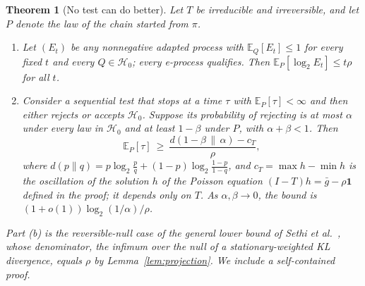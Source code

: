 \documentclass[11pt]{article}
\newtheorem{theorem}{Theorem}[section]
\theoremstyle{definition}
\theoremstyle{remark}
\newcommand{\E}{\mathbb{E}}
\newcommand{\Hnull}{\mathcal{H}_0}
\begin{document}
\begin{theorem}[No test can do better]\label{thm:lower}
Let $T$ be irreducible and irreversible, and let $P$ denote the law of the chain started from $\pi$.
\begin{enumerate}[label=(\alph*),itemsep=0.1em]
\item Let $(E_t)$ be any nonnegative adapted process with $\E_Q[E_t]\le1$ for every fixed $t$ and every $Q\in\Hnull$; every e-process qualifies. Then $\E_P[\log_2E_t]\le t\rho$ for all $t$.
\item Consider a sequential test that stops at a time $\tau$ with $\E_P[\tau]<\infty$ and then either rejects or accepts $\Hnull$. Suppose its probability of rejecting is at most $\alpha$ under every law in $\Hnull$ and at least $1-\beta$ under $P$, with $\alpha+\beta<1$. Then
\[
\E_P[\tau]\ \ge\ \frac{d(1-\beta\,\|\,\alpha)-c_T}{\rho},
\]
where $d(p\|q)=p\log_2\frac pq+(1-p)\log_2\frac{1-p}{1-q}$, and $c_T=\max h-\min h$ is the oscillation of the solution $h$ of the Poisson equation $(I-T)h=\bar g-\rho\mathbf 1$ defined in the proof; it depends only on $T$. As $\alpha,\beta\to0$, the bound is $(1+o(1))\log_2(1/\alpha)/\rho$.
\end{enumerate}
Part (b) is the reversible-null case of the general lower bound of Sethi et al.\ \cite[Thm.~3.3]{sethi2026}, whose denominator, the infimum over the null of a stationary-weighted KL divergence, equals $\rho$ by Lemma~\ref{lem:projection}. We include a self-contained proof.
\end{theorem}
\end{document}
